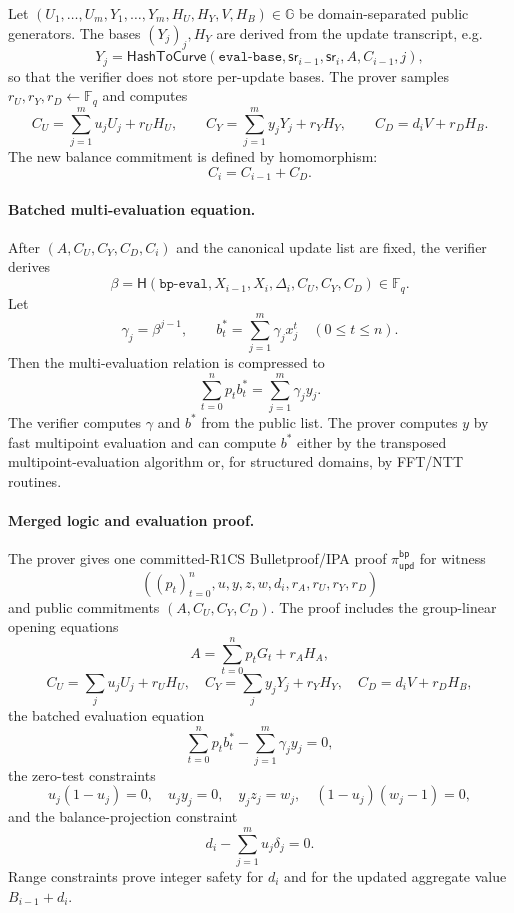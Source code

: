 \documentclass[runningheads]{llncs}
\newcommand{\F}{\mathbb{F}}
\newcommand{\G}{\mathbb{G}}
\newcommand{\HashToCurve}{\mathsf{HashToCurve}}
\newcommand{\sr}{\mathsf{sr}}
\newcommand{\dlist}{\Delta}
\newcommand{\Hash}{\mathsf{H}}
\begin{document}
Let \((U_1,\ldots,U_m,Y_1,\ldots,Y_m,H_U,H_Y,V,H_B)\in\G\) be domain-separated public generators.  The bases \((Y_j)_j,H_Y\) are derived from the update transcript, e.g.
\[
        Y_j=\HashToCurve(\mathtt{eval\mbox{-}base},\sr_{i-1},\sr_i,A,C_{i-1},j),
\]
so that the verifier does not store per-update bases.  The prover samples \(r_U,r_Y,r_D\leftarrow\F_q\) and computes
\[
        C_U=\sum_{j=1}^m u_jU_j+r_UH_U,
        \qquad
        C_Y=\sum_{j=1}^m y_jY_j+r_YH_Y,
        \qquad
        C_D=d_iV+r_DH_B.
\]
The new balance commitment is defined by homomorphism:
\[
        C_i=C_{i-1}+C_D.
\]

\paragraph{Batched multi-evaluation equation.}
After \((A,C_U,C_Y,C_D,C_i)\) and the canonical update list are fixed, the verifier derives
\[
        \beta=\Hash(\mathtt{bp\mbox{-}eval},X_{i-1},X_i,\dlist_i,C_U,C_Y,C_D)\in\F_q .
\]
Let
\[
        \gamma_j=\beta^{j-1},\qquad
        b_t^*=\sum_{j=1}^m\gamma_jx_j^t\quad (0\le t\le n).
\]
Then the multi-evaluation relation is compressed to
\[
        \sum_{t=0}^np_tb_t^*=
        \sum_{j=1}^m\gamma_jy_j.
\]
The verifier computes \(\gamma\) and \(b^*\) from the public list.  The prover computes \(y\) by fast multipoint evaluation and can compute \(b^*\) either by the transposed multipoint-evaluation algorithm or, for structured domains, by FFT/NTT routines.

\paragraph{Merged logic and evaluation proof.}
The prover gives one committed-R1CS Bulletproof/IPA proof \(\pi_{\mathsf{upd}}^{\mathsf{bp}}\) for witness
\[
        ((p_t)_{t=0}^n,u,y,z,w,d_i,r_A,r_U,r_Y,r_D)
\]
and public commitments \((A,C_U,C_Y,C_D)\).  The proof includes the group-linear opening equations
\[
 A=\sum_{t=0}^np_tG_t+r_AH_A,
\]
\[
 C_U=\sum_j u_jU_j+r_UH_U,
\quad
 C_Y=\sum_j y_jY_j+r_YH_Y,
\quad
 C_D=d_iV+r_DH_B,
\]
the batched evaluation equation
\[
        \sum_{t=0}^np_tb_t^*-\sum_{j=1}^m\gamma_jy_j=0,
\]
the zero-test constraints
\[
 u_j(1-u_j)=0,
 \quad u_jy_j=0,
 \quad y_jz_j=w_j,
 \quad (1-u_j)(w_j-1)=0,
\]
and the balance-projection constraint
\[
        d_i-\sum_{j=1}^m u_j\delta_j=0.
\]
Range constraints prove integer safety for \(d_i\) and for the updated aggregate value \(B_{i-1}+d_i\).
\end{document}
